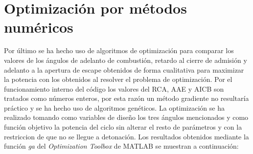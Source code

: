 \section{Optimización por métodos numéricos} \label{s:section_08}

Por último se ha hecho uso de algoritmos de optimización para comparar los valores de los ángulos de adelanto de combustión, retardo al cierre de admisión y %
adelanto a la apertura de escape obtenidos de forma cualitativa para maximizar la potencia con los obtenidos al resolver el problema de optimización. %
Por el funcionamiento interno del código los valores del RCA, AAE y AICB son tratados como números enteros, por esta razón un método gradiente no resultaría %
práctico y se ha hecho uso de algoritmos genéticos. La optimización se ha realizado tomando como variables de diseño los tres ángulos mencionados y como función objetivo %
la potencia del ciclo sin alterar el resto de parámetros y con la restriccion de que no se llegue a detonación.
Los resultados obtenidos mediante la función \textit{ga} del \textit{Optimization Toolbox} de MATLAB se muestran a continuación:


